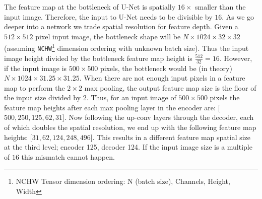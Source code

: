 The feature map at the bottleneck of U-Net is spatially $16 \times$ smaller than the input image. Therefore, the input to U-Net needs to be divisible by $16$.
As we go deeper into a network we trade spatial resolution for feature depth. Given a $512 \times 512$ pixel input image, the bottleneck shape will be $N \times 1024 \times 32 \times 32$ (assuming \texttt{NCHW}\footnote{NCHW Tensor dimension ordering: N (batch size), Channels, Height, Width} dimension ordering with unknown batch size). Thus the input image height divided by the bottleneck feature map height is $\frac{512}{32} = 16$. However, if the input image is $500 \times 500$ pixels, the bottleneck would be (in theory) $N \times 1024 \times 31.25 \times 31.25$. When there are not enough input pixels in a feature map to perform the $2 \times 2$ max pooling, the output feature map size is the floor of the input size divided by $2$. 
Thus, for an input image of $500 \times 500$ pixels the feature map heights after each max pooling layer in the encoder are: [$500, 250, 125, 62, 31$]. Now following the up-conv layers through the decoder, each of which doubles the spatial resolution, we end up with the following feature map heights: [$31, 62, 124, 248, 496$]. This results in a different feature map spatial size at the third level; encoder 125, decoder 124. If the input image size is a multiple of $16$ this mismatch cannot happen. 


%
